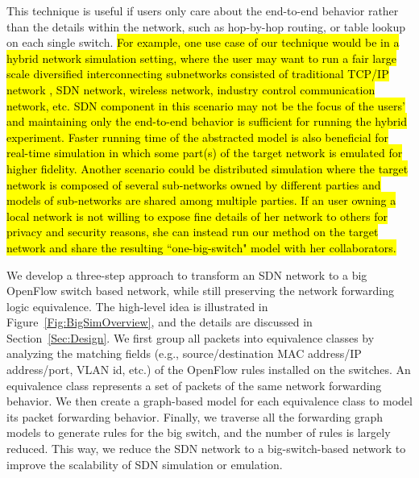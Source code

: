This technique is useful if users only care about the end-to-end behavior rather than
the details within the network, such as hop-by-hop routing, or table lookup on each single switch.
\hl{
For example, one use case of our technique would be in a hybrid network simulation setting, where the user may want to run a fair large scale diversified
interconnecting subnetworks consisted of traditional TCP/IP network , SDN network, wireless network,
industry control communication network, etc.
SDN component in this scenario may not be the focus of the users' and
maintaining only the end-to-end behavior is sufficient for running the hybrid experiment.
Faster running time of the abstracted model is also beneficial for
real-time simulation in which some part(s) of the target network is emulated for higher fidelity.
Another scenario could be distributed simulation where the target network is composed of
several sub-networks owned by different parties and models of sub-networks
are shared among multiple parties.
If an user owning a local network is not willing to expose fine details of
her network to others for privacy and security reasons,
she can instead run our method on the target network and
share the resulting ``one-big-switch" model with her collaborators.
}

We develop a three-step approach to transform an SDN network to a big OpenFlow switch based network,
while still preserving the network forwarding logic equivalence.
The high-level idea is illustrated in Figure~\ref{Fig:BigSimOverview},
and the details are discussed in Section~\ref{Sec:Design}.
We first group all packets into equivalence classes by analyzing the matching fields
(e.g., source/destination MAC address/IP address/port, VLAN id, etc.)
of the OpenFlow rules installed on the switches.
An equivalence class represents a set of packets of the same network forwarding behavior.
We then create a graph-based model for each equivalence class to model its packet forwarding behavior.
Finally, we traverse all the forwarding graph models to generate rules for the big switch,
and the number of rules is largely reduced.
This way, we reduce the SDN network to a big-switch-based network to
improve the scalability of SDN simulation or emulation.

